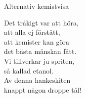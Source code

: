 \begin{song}{Alternativ kemistvisa}

    
    

    Det tråkigt var att höra,\\
    att alla ej förstått,\\
    att kemister kan göra\\
    det bästa mänskan fått.\\
    Vi tillverkar ju spriten,\\
    så kallad etanol.\\
    Av denna hankeskiten\\
    knappt någon droppe tål!

\end{song}
